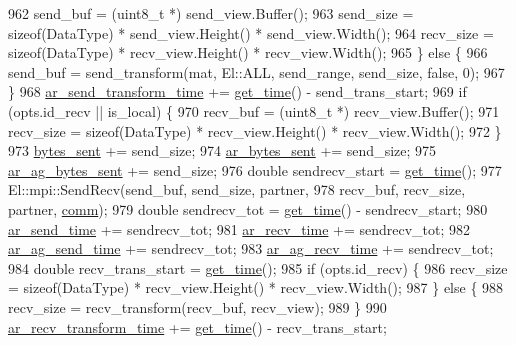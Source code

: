 \begin{DoxyCode}
962       send\_buf = (uint8\_t *) send\_view.Buffer();
963       send\_size = \textcolor{keyword}{sizeof}(DataType) * send\_view.Height() * send\_view.Width();
964       recv\_size = \textcolor{keyword}{sizeof}(DataType) * recv\_view.Height() * recv\_view.Width();
965     \} \textcolor{keywordflow}{else} \{
966       send\_buf = send\_transform(mat, El::ALL, send\_range, send\_size, \textcolor{keyword}{false}, 0);
967     \}
968     \hyperlink{classlbann_1_1lbann__comm_a4e3d35520a8f567579f9235e9808ba1c}{ar\_send\_transform\_time} += \hyperlink{namespacelbann_a478d36031ff0659893c4322cd856157f}{get\_time}() - send\_trans\_start;
969     \textcolor{keywordflow}{if} (opts.id\_recv || is\_local) \{
970       recv\_buf = (uint8\_t *) recv\_view.Buffer();
971       recv\_size = \textcolor{keyword}{sizeof}(DataType) * recv\_view.Height() * recv\_view.Width();
972     \}
973     \hyperlink{classlbann_1_1lbann__comm_ad1f146ae7337ece6266fd307944928e0}{bytes\_sent} += send\_size;
974     \hyperlink{classlbann_1_1lbann__comm_aa520c16eafde742b70daf60866afc6a8}{ar\_bytes\_sent} += send\_size;
975     \hyperlink{classlbann_1_1lbann__comm_a2cfe1264a83865360692c48d7869fe67}{ar\_ag\_bytes\_sent} += send\_size;
976     \textcolor{keywordtype}{double} sendrecv\_start = \hyperlink{namespacelbann_a478d36031ff0659893c4322cd856157f}{get\_time}();
977     El::mpi::SendRecv(send\_buf, send\_size, partner,
978                       recv\_buf, recv\_size, partner, \hyperlink{file__io_8cpp_ab048c6f9fcbcfaa57ce68b00263dbebe}{comm});
979     \textcolor{keywordtype}{double} sendrecv\_tot = \hyperlink{namespacelbann_a478d36031ff0659893c4322cd856157f}{get\_time}() - sendrecv\_start;
980     \hyperlink{classlbann_1_1lbann__comm_a60a664f47efb52d9936b72d34059d1ef}{ar\_send\_time} += sendrecv\_tot;
981     \hyperlink{classlbann_1_1lbann__comm_a4c9323938961c3524dc67f4b7b47e3ae}{ar\_recv\_time} += sendrecv\_tot;
982     \hyperlink{classlbann_1_1lbann__comm_a64cb0b86e9368c1d83370ba6cb0083ba}{ar\_ag\_send\_time} += sendrecv\_tot;
983     \hyperlink{classlbann_1_1lbann__comm_a1896c3ecd1d5b084497c6ed47c1c9bae}{ar\_ag\_recv\_time} += sendrecv\_tot;
984     \textcolor{keywordtype}{double} recv\_trans\_start = \hyperlink{namespacelbann_a478d36031ff0659893c4322cd856157f}{get\_time}();
985     \textcolor{keywordflow}{if} (opts.id\_recv) \{
986       recv\_size = \textcolor{keyword}{sizeof}(DataType) * recv\_view.Height() * recv\_view.Width();
987     \} \textcolor{keywordflow}{else} \{
988       recv\_size = recv\_transform(recv\_buf, recv\_view);
989     \}
990     \hyperlink{classlbann_1_1lbann__comm_adb393f47d60eaa59bace80d2d3dd3bf2}{ar\_recv\_transform\_time} += \hyperlink{namespacelbann_a478d36031ff0659893c4322cd856157f}{get\_time}() - recv\_trans\_start;

\end{DoxyCode}
